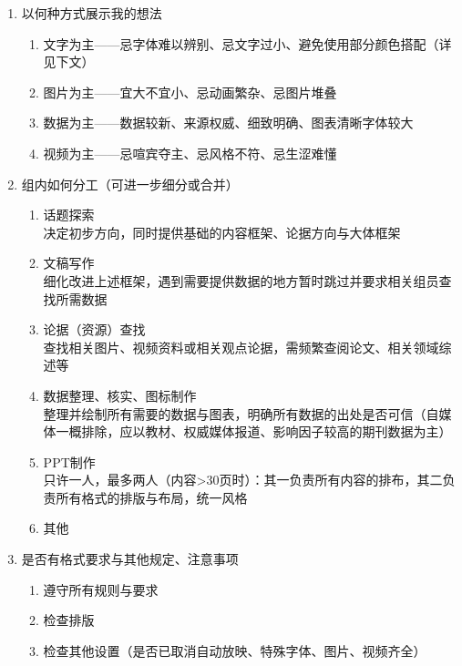 \begin{enumerate}
    \item 以何种方式展示我的想法
          \begin{enumerate}
              \item 文字为主——忌字体难以辨别、忌文字过小、避免使用部分颜色搭配（详见下文）
              \item 图片为主——宜大不宜小、忌动画繁杂、忌图片堆叠
              \item 数据为主——数据较新、来源权威、细致明确、图表清晰字体较大
              \item 视频为主——忌喧宾夺主、忌风格不符、忌生涩难懂
          \end{enumerate}
          \pagebreak[3]
    \item 组内如何分工（可进一步细分或合并）
          \begin{enumerate}
              \item 话题探索\\
                    决定初步方向，同时提供基础的内容框架、论据方向与大体框架
              \item 文稿写作\\
                    细化改进上述框架，遇到需要提供数据的地方暂时跳过并要求相关组员查找所需数据
              \item 论据（资源）查找\\
                    查找相关图片、视频资料或相关观点论据，需频繁查阅论文、相关领域综述等
              \item 数据整理、核实、图标制作\\
                    整理并绘制所有需要的数据与图表，明确所有数据的出处是否可信（自媒体一概排除，应以教材、权威媒体报道、影响因子较高的期刊数据为主）
              \item PPT制作\\
                    只许一人，最多两人（内容>30页时）：其一负责所有内容的排布，其二负责所有格式的排版与布局，统一风格
              \item 其他
          \end{enumerate}
    \item 是否有格式要求与其他规定、注意事项
          \begin{enumerate}
              \item 遵守所有规则与要求
              \item 检查排版
              \item 检查其他设置（是否已取消自动放映、特殊字体、图片、视频齐全）
          \end{enumerate}
\end{enumerate}

